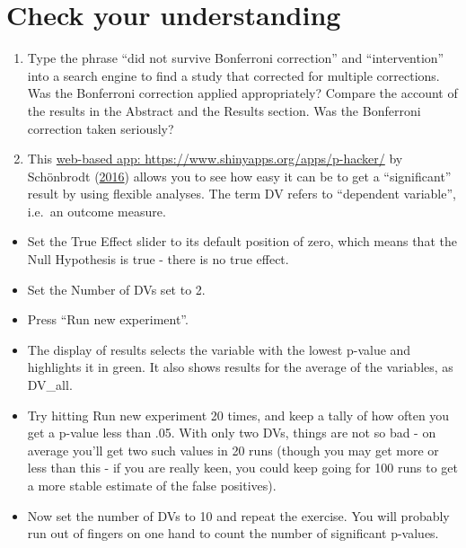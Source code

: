 \documentclass{krantz}
\begin{document}
\hypertarget{check-your-understanding-13}{%
\section{Check your understanding}\label{check-your-understanding-13}}

\begin{enumerate}
\def\labelenumi{\arabic{enumi}.}
\item
  Type the phrase ``did not survive Bonferroni correction'' and ``intervention'' into a search engine to find a study that corrected for multiple corrections. Was the Bonferroni correction applied appropriately? Compare the account of the results in the Abstract and the Results section. Was the Bonferroni correction taken seriously?
\item
  This \href{https://www.shinyapps.org/apps/p-hacker/}{web-based app: https://www.shinyapps.org/apps/p-hacker/} by Schönbrodt (\protect\hyperlink{ref-schonbrodt2016}{2016}) allows you to see how easy it can be to get a ``significant'' result by using flexible analyses. The term DV refers to ``dependent variable'', i.e.~an outcome measure.\\
\end{enumerate}

\begin{itemize}
\item
  Set the True Effect slider to its default position of zero, which means that the Null Hypothesis is true - there is no true effect.\\
\item
  Set the Number of DVs set to 2.\\
\item
  Press ``Run new experiment''.\\
\item
  The display of results selects the variable with the lowest p-value and highlights it in green. It also shows results for the average of the variables, as DV\_all.
\item
  Try hitting Run new experiment 20 times, and keep a tally of how often you get a p-value less than .05. With only two DVs, things are not so bad - on average you'll get two such values in 20 runs (though you may get more or less than this - if you are really keen, you could keep going for 100 runs to get a more stable estimate of the false positives).\\
\item
  Now set the number of DVs to 10 and repeat the exercise. You will probably run out of fingers on one hand to count the number of significant p-values.
\end{itemize}
\end{document}

